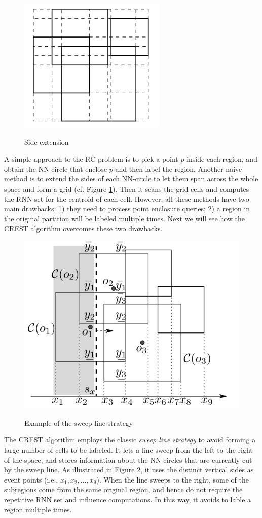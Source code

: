\documentclass[paper=a4, fontsize=18pt]{article} %
\numberwithin{equation}{section} %
\numberwithin{figure}{section} %
\numberwithin{table}{section} %
\begin{document}
\begin{figure}[h]
  \centering
  \includegraphics[width=.3\linewidth]{8_22_side.png}\\
  \caption{Side extension}\label{fig:side}
\end{figure}

A simple approach to the RC problem is to pick a point $p$ inside each region, and obtain the NN-circle that enclose $p$ and then label the region. Another naive method is to extend the sides of each NN-circle to let them span across the whole space and form a grid (cf. Figure \ref{fig:side}). Then it scans the grid cells and computes the RNN set for the centroid of each cell. However, all these methods have two main drawbacks: 1) they need to process point enclosure queries; 2) a region in the original partition will be labeled multiple times. Next we will see how the CREST algorithm overcomes these two drawbacks.

\begin{figure}[h]
  \centering
  \includegraphics[width=.5\linewidth]{8_22_sweep.png}\\
  \caption{Example of the sweep line strategy}\label{fig:sweep}
\end{figure}

The CREST algorithm employs the classic \emph{sweep line strategy} to avoid forming a large number of cells to be labeled. It lets a line sweep from the left to the right of the space, and stores information about the NN-circles that are currently cut by the sweep line. As illustrated in Figure \ref{fig:sweep}, it uses the distinct vertical sides as event points (i.e., $x_1, x_2, ..., x_9$). When the line sweeps to the right, some of the subregions come from the same original region, and hence do not require the repetitive RNN set and influence computations. In this way, it avoids to lable a region multiple times.
\end{document}
